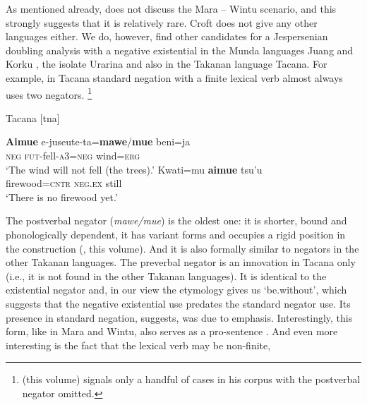 ﻿\documentclass[output=paper]{langsci/langscibook}
\begin{document}
As mentioned already, \textcites{Veselinova2010}{Veselinova2013}{Veselinova2014}{Veselinova2015}{Veselinova2016} does not
discuss the Mara -- Wintu scenario, and this strongly suggests that it is
relatively rare. Croft does not give any other languages either. We do,
however, find other candidates for a Jespersenian doubling analysis with a
negative existential in the Munda languages Juang
\parencite[150--151]{Anderson2007} and Korku \parencites[64--67]{Nagaraja1999}
[279--281]{Zide2008}, the isolate Urarina and also in the Takanan
language Tacana. For example, in Tacana standard negation with a finite
lexical verb almost always uses two negators.%
%
\footnote{\citeauthor{Guillaume2019} (this volume) signals only a handful of cases in his corpus with the postverbal negator
omitted.}
%
\begin{exe}\ex\label{ex:int-tacana-wind-firewood}
Tacana [tna] 
\begin{xlist}
    \ex\gll \textbf{Aimue}    e-juseute-ta=\textbf{mawe}/\textbf{mue}
    beni=ja \\
    \textsc{neg}    \textsc{fut-}fell-\textsc{a}3=\textsc{neg}    wind=\textsc{erg} \\
    \glt `The wind will not fell (the trees).'
    \ex\gll Kwati=mu    \textbf{aimue}    tsu'u\\
firewood=\textsc{cntr}  \textsc{neg.ex}  still\\
\glt `There is no firewood yet.'
    \end{xlist}\end{exe}
%
The postverbal negator (\textit{mawe/mue}) is the oldest one: it is
shorter, bound and phonologically dependent, it has variant forms and
occupies a rigid position in the construction (\citealt{Guillaume2016a},
\citeauthor{Guillaume2019} this volume). And it is also formally similar to
negators in the
other Takanan languages. The preverbal negator is an innovation in
Tacana
only (i.e., it is not found in the other Takanan languages). It is
identical to the existential negator and, in our view 
\parencite{AuweraKrasnoukhova2018} the etymology gives us `be.without',
which suggests that the negative existential use predates the standard
negator use. Its presence in standard negation, \textcite{Guillaume2016a}
suggests, was due to emphasis. Interestingly, this form, like in Mara and
Wintu, also serves as a pro-sentence \parencites{Guillaume2016a}{Guillaume2017}. And
even more interesting is the fact that the lexical verb may be non-finite,
\end{document}

